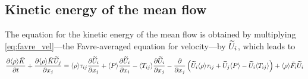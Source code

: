 \documentclass[oneside,a4paper,11pt]{report}
\begin{document}
\subsection{Kinetic energy of the mean flow}
The equation for the kinetic energy of the mean flow is obtained by multiplying \cref{eq:favre_vel}---the Favre-averaged equation for velocity---by $\widetilde{U}_i$, which leads to
\begin{equation}
\label{eq:ke_favreflow}
\frac{ \partial \langle \rho \rangle \bar{K} }{ \partial t} + \frac{ \partial \langle \rho \rangle \bar{K} \widetilde{U}_j }{ \partial x_j} = \langle \rho \rangle \tau_{ij} \frac{ \partial \widetilde{U}_i }{ \partial x_j } + \langle P \rangle \frac{ \partial \widetilde{U}_i }{ \partial x_i } - \langle T_{ij} \rangle \frac{ \partial \widetilde{U}_i }{ \partial x_j } - \frac{\partial}{\partial x_j} \left ( \widetilde{U}_i \langle \rho \rangle \tau_{ij} + \widetilde{U}_j \langle P \rangle - \widetilde{U}_i \langle T_{ij} \rangle \right ) + \langle \rho \rangle \tilde{F}_i \widetilde{U}_i
\end{equation}

\end{document}
